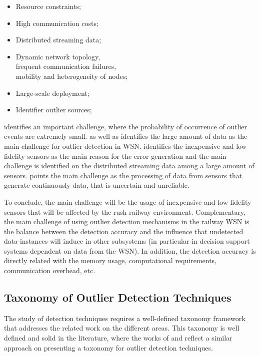 \begin{itemize}
	\setlength\itemsep{-0.5em}
	
	\item Resource constraints;
	
	\item High communication costs;
	
	\item Distributed streaming data;
	
	\item Dynamic network topology, \\ frequent communication failures, \\ mobility and heterogeneity of nodes;
	
	\item Large-scale deployment;
	
	\item Identifier outlier sources;
	
\end{itemize}

\cite{class:branch:2006} identifies an important challenge, where the probability of occurrence of outlier events are extremely small. \cite{nn:abid:2016} as well as \cite{stat:sheng:2007} identifies the large amount of data as the main challenge for outlier detection in WSN. \cite{nn:zhuang:2006} identifies the inexpensive and low fidelity sensors as the main reason for the error generation and the main challenge is identified on the distributed streaming data among a large amount of sensors. \cite{stat:ghorbel:2015} points the main challenge as the processing of data from sensors that generate continuously data, that is uncertain and unreliable. 

To conclude, the main challenge will be the usage of inexpensive and low fidelity sensors that will be affected by the rush railway environment. Complementary, the main challenge of using outlier detection mechanisms in the railway WSN is the balance between the detection accuracy and the influence that undetected data-instances will induce in other subsystems (in particular in decision support systems dependent on data from the WSN). In addition, the detection accuracy is directly related with the memory usage, computational requirements, communication overhead, etc. 


\subsection{Taxonomy of Outlier Detection Techniques}
\label{sec:taxon}
The study of detection techniques requires a well-defined taxonomy framework that addresses the related work on the different areas. This taxonomy is well defined and solid in the literature, where the works of \cite{gen:zhang:2010} and \cite{gen:chandola:2009} reflect a similar approach on presenting a taxonomy for outlier detection techniques.

